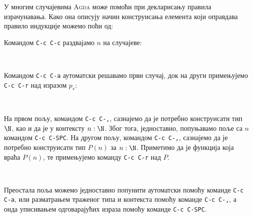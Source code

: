 У многим случајевима \textsc{Agda} може помоћи при декларисању правила израчунавања. Како она описују начин конструисања елемента који оправдава правило индукције можемо поћи од:
\begin{code}%
\>[0]\AgdaSpace{}%
\AgdaSpace{}%
\AgdaSpace{}%
\AgdaSpace{}%
\AgdaSpace{}%
\AgdaSymbol{=}\AgdaSpace{}%
\AgdaHole{\{!\ \ \ !\}}\<%
\end{code}
Командом \texttt{C-c C-c} раздвајамо $n$ на случајеве:
\begin{code}%
\>[0]\AgdaSpace{}%
\AgdaSpace{}%
\AgdaSpace{}%
\AgdaSpace{}%
%
\>[29]\AgdaSymbol{=}\AgdaSpace{}%
\AgdaHole{\{!\ \ \ !\}}\<%
\\
\>[0]\AgdaSpace{}%
\AgdaSpace{}%
\AgdaSpace{}%
\AgdaSpace{}%
\AgdaSymbol{(}\AgdaSpace{}%
\AgdaSymbol{)}\AgdaSpace{}%
\AgdaSymbol{=}\AgdaSpace{}%
\AgdaHole{\{!\ \ \ !\}}\<%
\end{code}
Командом \texttt{C-c C-а} аутоматски решавамо први случај, док на други примењујемо \texttt{C-c C-r} над изразом $p_s$:
\begin{code}%
\>[0]\AgdaSpace{}%
\AgdaSpace{}%
\AgdaSpace{}%
\AgdaSpace{}%
%
\>[29]\AgdaSymbol{=}\AgdaSpace{}%
\<%
\\
\>[0]\AgdaSpace{}%
\AgdaSpace{}%
\AgdaSpace{}%
\AgdaSpace{}%
\AgdaSymbol{(}\AgdaSpace{}%
\AgdaSymbol{)}\AgdaSpace{}%
\AgdaSymbol{=}\AgdaSpace{}%
\AgdaSpace{}%
\AgdaHole{\{!\ \ \ !\}}\AgdaSpace{}%
\AgdaHole{\{!\ \ \ !\}}\<%
\end{code}
На првом пољу, командом \texttt{C-c C-,}, сазнајемо да је потребно конструисати тип $\N$, као и да је у контексту $n : \N$. Због тога, једноставно, попуњавамо поље са $n$ командом \texttt{C-c C-SPC}. На другом пољу, командом \texttt{C-c C-,}, сазнајемо да је потребно конструисати тип $P(n)$ за $n : \N$. Приметимо да је  функција која враћа $P(n)$, те примењујемо команду \texttt{C-c C-r} над  $P$.
\begin{code}%
\>[0]\AgdaSpace{}%
\AgdaSpace{}%
\AgdaSpace{}%
\AgdaSpace{}%
%
\>[29]\AgdaSymbol{=}\AgdaSpace{}%
\<%
\\
\>[0]\AgdaSpace{}%
\AgdaSpace{}%
\AgdaSpace{}%
\AgdaSpace{}%
\AgdaSymbol{(}\AgdaSpace{}%
\AgdaSymbol{)}\AgdaSpace{}%
\AgdaSymbol{=}\AgdaSpace{}%
\AgdaSpace{}%
\AgdaSpace{}%
\AgdaSymbol{(}\AgdaSpace{}%
\AgdaSpace{}%
\AgdaHole{\{!\ \ \ !\}}\AgdaSpace{}%
\AgdaHole{\{!\ \ \ !\}}\AgdaSpace{}%
\AgdaHole{\{!\ \ \ !\}}\AgdaSymbol{)}\<%
\end{code}
Преостала поља можемо једноставно попунити аутоматски помоћу команде \texttt{C-c C-a}, или разматрањем траженог типа и контекста помоћу команде \texttt{C-c C-,}, а онда уписивањем одговарајућих израза помоћу команде \texttt{C-c C-SPC}.
